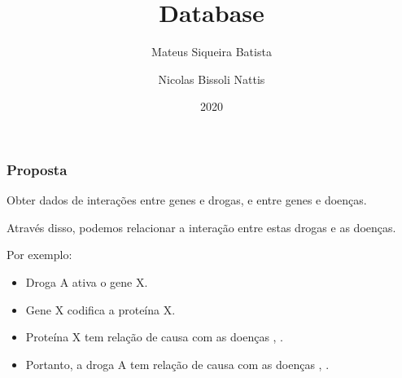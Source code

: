\documentclass[12pt]{beamer}
\title[Database]{Database}
\author{
  Mateus Siqueira Batista\and
  Nicolas Bissoli Nattis
}
\institute{
  Instituto de Computação, UNICAMP
}
\date[2020]{2020}
\begin{document}
\frame{\titlepage}

\begin{frame}
  \frametitle{Proposta}
  Obter dados de interações entre genes e drogas, e entre genes e doenças.
  \pause

  Através disso, podemos relacionar a interação entre estas drogas e as doenças.
  \pause
  
  Por exemplo:
  \begin{itemize}
    \item Droga A ativa o gene X.
    \item Gene X codifica a proteína X.
    \item Proteína X tem relação de causa com as doenças \textalpha, \textgamma.
    \item Portanto, a droga A tem relação de causa com as doenças \textalpha, \textgamma.
  \end{itemize}
\end{frame}
\end{document}
